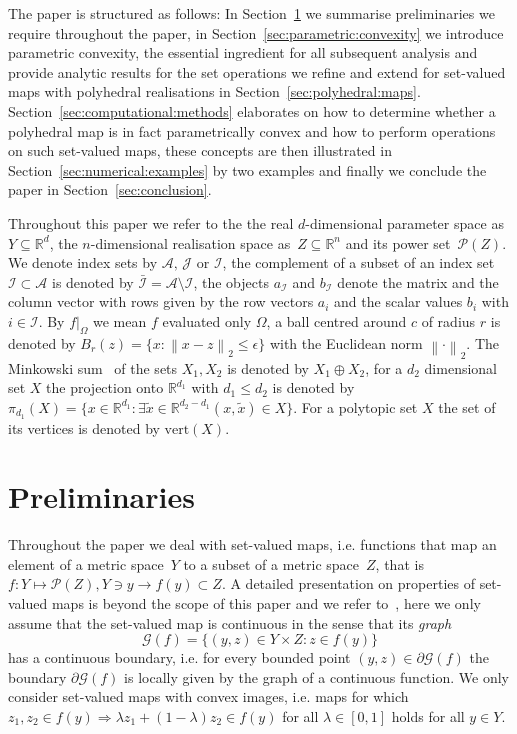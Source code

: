 \documentclass[final]{elsarticle}
\providecommand{\norm}[1]{\left\|#1\right\|}
\theoremstyle{remark}
\theoremstyle{definition}
\begin{document}
The paper is structured as follows:
%
In Section~\ref{sec:preliminaries} we summarise preliminaries we require throughout the paper, in Section~\ref{sec:parametric:convexity} we introduce parametric convexity, the essential ingredient for all subsequent analysis and provide analytic results for the set operations we refine and extend for set-valued maps with polyhedral realisations in Section~\ref{sec:polyhedral:maps}.
%
Section~\ref{sec:computational:methods} elaborates on how to determine whether a polyhedral map is in fact parametrically convex and how to perform operations on such set-valued maps, these concepts are then illustrated in Section~\ref{sec:numerical:examples} by two examples and finally we conclude the paper in Section~\ref{sec:conclusion}.


Throughout this paper we refer to the the real $d$-dimensional parameter space as $Y\subseteq\mathbb R^d$, the $n$-dimensional realisation space as~$Z\subseteq\mathbb R^n$ and its power set~$\mathscr P(Z)$.
%
We denote index sets by $\mathcal A,\,\mathcal J$ or $\mathcal I$, the complement of a subset of an index set $\mathcal I\subset\mathcal A$ is denoted by $\bar{\mathcal I}=\mathcal A\setminus\mathcal I$, the objects $a_{\mathcal I}$ and $b_{\mathcal I}$ denote the matrix and the column vector with rows given by the row vectors $a_i$ and the scalar values $b_i$ with $i\in\mathcal I$.
%
By $f\vert_\Omega$ we mean $f$ evaluated only $\Omega$, a ball centred around $c$ of radius $r$ is denoted by $B_r(z)=\{x:\norm{x-z}_2\leq\epsilon\}$ with the Euclidean norm $\norm{\cdot}_2$.
%
The Minkowski sum~\cite{Minkowski:1911} of the sets $X_1,X_2$ is denoted by $X_1\oplus X_2$, for a $d_2$ dimensional set $X$ the projection onto $\mathbb R^{d_1}$ with $d_1\leq d_2$ is denoted by $\pi_{d_1}(X) = \{x\in\mathbb R^{d_1}:\exists \tilde x\in\mathbb R^{d_2-d_1} (x,\tilde x)\in X\}$.
%
For a polytopic set $X$ the set of its vertices is denoted by $\text{vert}(X)$.
%
\section{Preliminaries}\label{sec:preliminaries}

Throughout the paper we deal with set-valued maps, i.e. functions that map an element of a metric space~$Y$ to a subset of a metric space~$Z$, that is $f:Y\mapsto\mathscr P(Z), Y\ni y\rightarrow f(y)\subset Z$. 
%
A detailed presentation on properties of set-valued maps is beyond the scope of this paper and we refer to~\cite{Aubin:2009}, here we only assume that the set-valued map is continuous in the sense that its \emph{graph}
%
\begin{equation}
  \mathscr G(f) = \{(y,z)\in Y\times Z: z\in f(y)\}
\end{equation}
%
has a continuous boundary, i.e. for every bounded point $(y,z)\in\partial\mathscr G(f)$ the boundary $\partial\mathscr G(f)$ is locally given by the graph of a continuous function.
%
We only consider set-valued maps with convex images, i.e. maps for which $z_1,z_2\in f(y)\Rightarrow \lambda z_1+(1-\lambda)z_2\in f(y)$ for all $\lambda\in[0,1]$ holds for all $y\in Y$.
\end{document}
